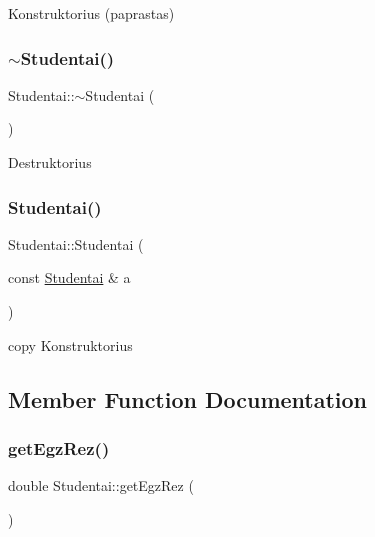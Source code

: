 Konstruktorius (paprastas) \mbox{\label{class_studentai_a10895815f551906aae4c2823bfd1bbc5}} 
\subsubsection{\texorpdfstring{$\sim$Studentai()}{~Studentai()}}
{\footnotesize\ttfamily Studentai\+::$\sim$\+Studentai (\begin{DoxyParamCaption}{ }\end{DoxyParamCaption})\hspace{0.3cm}{\ttfamily [inline]}}

Destruktorius \mbox{\label{class_studentai_a0c7d19b397626f33dc2e127d7c41c445}} 
\subsubsection{\texorpdfstring{Studentai()}{Studentai()}\hspace{0.1cm}{\footnotesize\ttfamily [2/2]}}
{\footnotesize\ttfamily Studentai\+::\+Studentai (\begin{DoxyParamCaption}\item[{const \mbox{\hyperlink{class_studentai}{Studentai}} \&}]{a }\end{DoxyParamCaption})\hspace{0.3cm}{\ttfamily [inline]}}

copy Konstruktorius 

\subsection{Member Function Documentation}
\mbox{\label{class_studentai_a9f8cc8dd7f888c7a8d9fb2db070195d6}} 
\subsubsection{\texorpdfstring{getEgzRez()}{getEgzRez()}}
{\footnotesize\ttfamily double Studentai\+::get\+Egz\+Rez (\begin{DoxyParamCaption}{ }\end{DoxyParamCaption})\hspace{0.3cm}{\ttfamily [inline]}}

